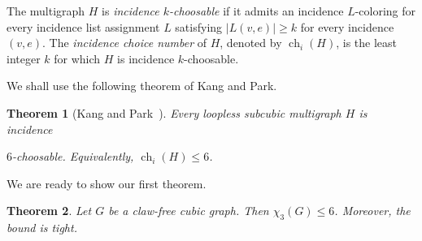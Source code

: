\documentclass[10pt,a4paper]{article}
\newtheorem{theorem}             {Theorem}
\theoremstyle{case}
\numberwithin{subcase}{case}
\begin{document}
The multigraph $H$ is \emph{incidence $k$-choosable} if it admits an
incidence $L$-coloring for every incidence list assignment $L$
satisfying
$
    |L(v,e)|\geq k
$
for every incidence $(v,e)$. The \emph{incidence choice number} of $H$,
denoted by $\operatorname{ch}_{i}(H)$, is the least integer $k$ for
which $H$ is incidence $k$-choosable.

We shall use the following theorem of Kang and Park.

\begin{theorem}[Kang and Park~\cite{KangPark2019}]
\label{thm:kang-park}
Every loopless subcubic multigraph $H$ is incidence

$6$-choosable. Equivalently,
$    \operatorname{ch}_{i}(H)\leq 6$.
\end{theorem}

We are ready to show our first theorem.

\begin{theorem} \label{thm:clawfreeleq6}
Let $G$ be a claw-free cubic graph. Then $\chi_3(G)\leq 6$.
Moreover, the bound is tight.
\end{theorem}
\end{document}
